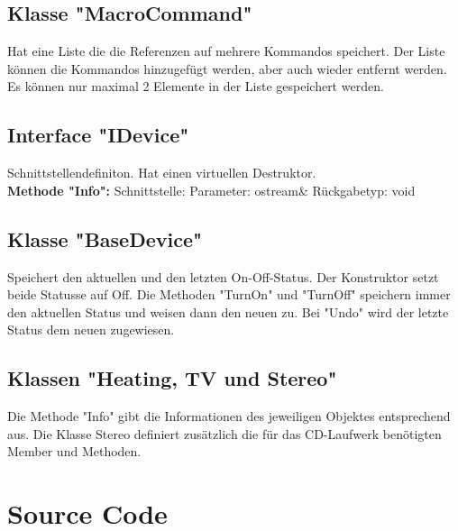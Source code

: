\documentclass[12pt,a4paper]{article}
\begin{document}
\subsection {Klasse "MacroCommand"}
Hat eine Liste die die Referenzen auf mehrere Kommandos speichert. Der Liste können die Kommandos hinzugefügt werden, aber auch wieder entfernt werden. Es können nur maximal 2 Elemente in der Liste gespeichert werden.
\\

\subsection {Interface "IDevice"}
Schnittstellendefiniton. Hat einen virtuellen Destruktor.
\\

\textbf {Methode "Info": } 
\newline
Schnittstelle:
\newline
Parameter: ostream\&
\newline
Rückgabetyp: void
\\

\subsection {Klasse "BaseDevice"}
Speichert den aktuellen und den letzten On-Off-Status. Der Konstruktor setzt beide Statusse auf Off. Die Methoden "TurnOn" und "TurnOff" speichern immer den aktuellen Status und weisen dann den neuen zu. Bei "Undo" wird der letzte Status dem neuen zugewiesen.
\\

\subsection {Klassen "Heating, TV und Stereo"}
Die Methode "Info" gibt die Informationen des jeweiligen Objektes entsprechend aus. Die Klasse Stereo definiert zusätzlich die für das CD-Laufwerk benötigten Member und Methoden.
\\

\newpage
\section {Source Code}
\end{document}
